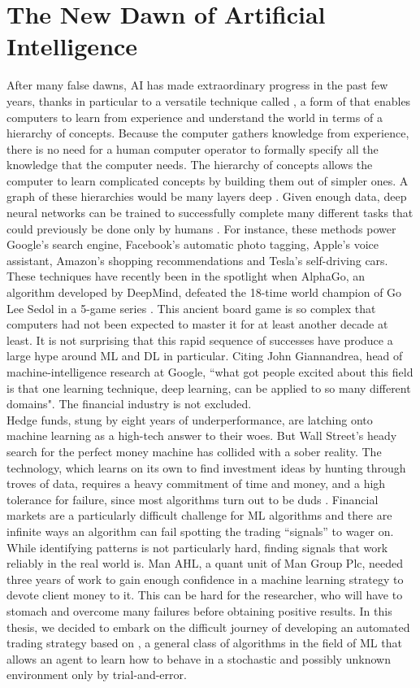 \section{The New Dawn of Artificial Intelligence}
After many false dawns, \gls{AI} has made extraordinary progress in the past few years, thanks in particular to a versatile technique called , a form of  that enables computers to learn from experience and understand the world in terms of a hierarchy of concepts. Because the computer gathers knowledge from experience, there is no need for a human computer operator to formally specify all the knowledge that the computer needs. The hierarchy of concepts allows the computer to learn complicated concepts by building them out of simpler ones. A graph of these hierarchies would be many layers deep \cite{Goodfellow-et-al-2016-Book}. Given enough data, deep neural networks can be trained to successfully complete many different tasks that could previously be done only by humans \cite{economist2016march}. For instance, these methods power Google's search engine, Facebook's automatic photo tagging, Apple's voice assistant, Amazon's shopping recommendations and Tesla's self-driving cars. These techniques have recently been in the spotlight when AlphaGo, an algorithm developed by DeepMind, defeated the 18-time world champion of Go Lee Sedol in a 5-game series \cite{silver2016mastering}. This ancient board game is so complex that computers had not been expected to master it for at least another decade at least. It is not surprising that this rapid sequence of successes have produce a large hype around \gls{ML} and \gls{DL} in particular. Citing John Giannandrea, head of machine-intelligence research at Google, ``what got people excited about this field is that one learning technique, deep learning, can be applied to so many different domains". The financial industry is not excluded.\\
Hedge funds, stung by eight years of underperformance, are latching onto machine learning as a high-tech answer to their woes. But Wall Street’s heady search for the perfect money machine has collided with a sober reality. The technology, which learns on its own to find investment ideas by hunting through troves of data, requires a heavy commitment of time and money, and a high tolerance for failure, since most algorithms turn out to be duds \cite{bloomberg2016ml}. Financial markets are a particularly difficult challenge for \gls{ML} algorithms and there are infinite ways an algorithm can fail spotting the trading ``signals'' to wager on. While identifying patterns is not particularly hard, finding signals that work reliably in the real world is. Man AHL, a quant unit of Man Group Plc, needed three years of work to gain enough confidence in a machine learning strategy to devote client money to it. This can be hard for the researcher, who will have to stomach and overcome many failures before obtaining positive results. In this thesis, we decided to embark on the difficult journey of developing an automated trading strategy based on , a general class of algorithms in the field of \gls{ML} that allows an agent to learn how to behave in a stochastic and possibly unknown environment only by trial-and-error.

